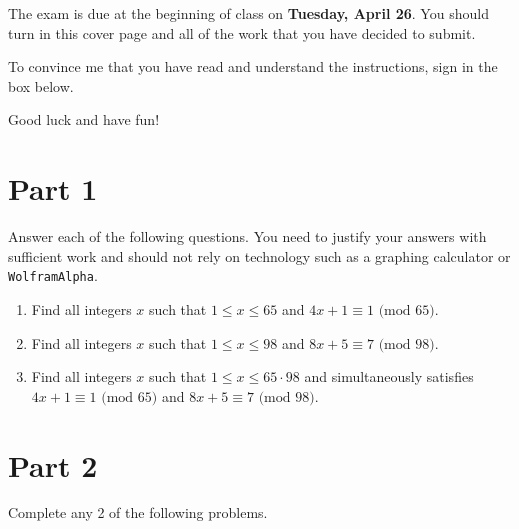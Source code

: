\documentclass[11pt]{article}
\theoremstyle{definition}
\begin{document}
The exam is due at the beginning of class on \textbf{Tuesday, April 26}.  You should turn in this cover page and all of the work that you have decided to submit.

\bigskip

To convince me that you have read and understand the instructions, sign in the box below.

\bigskip


\bigskip

Good luck and have fun!

\newpage

\section*{Part 1}
Answer each of the following questions.  You need to justify your answers with sufficient work and should not rely on technology such as a graphing calculator or \texttt{WolframAlpha}. 

\begin{enumerate}

\item Find all integers $x$ such that $1\leq x\leq 65$ and $4x+1\equiv 1 \mbox{ (mod } 65)$.

\item Find all integers $x$ such that $1\leq x\leq 98$ and $8x+5\equiv 7 \mbox{ (mod } 98)$.

\item Find all integers $x$ such that $1\leq x\leq 65\cdot 98$ and simultaneously satisfies $4x+1\equiv 1 \mbox{ (mod } 65)$ and $8x+5\equiv 7 \mbox{ (mod } 98)$.

\end{enumerate}

\section*{Part 2}

Complete any 2 of the following problems.
\end{document}
